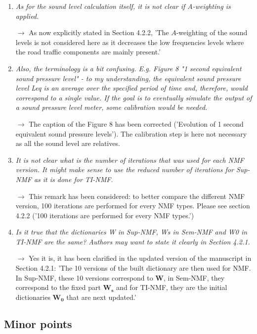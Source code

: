\documentclass[10pt]{article}
\begin{document}
\begin{enumerate}
\item \emph{As for the sound level calculation itself, it is not clear if A-weighting is applied.}

$\rightarrow$ As now explicitly stated in Section 4.2.2, 'The $A$-weighting of the sound levels is not considered here as it decreases the low frequencies levels where the road traffic components are mainly present.'

\item \emph{Also, the terminology is a bit confusing. E.g. Figure 8 "1 second equivalent sound pressure level" - to my understanding, the equivalent sound pressure level Leq is an average over the specified period of time and, therefore, would correspond to a single value. If the goal is to eventually simulate the output of a sound pressure level meter, some calibration would be needed.}

$\rightarrow$ The caption of the Figure 8 has been corrected ('Evolution of 1 second equivalent sound pressure levels'). The calibration step is here not necessary as all the sound level are relatives.

\item \emph{It is not clear what is the number of iterations that was used for each NMF version. It might make sense to use the reduced number of iterations for Sup-NMF as it is done for TI-NMF.}

$\rightarrow$ This remark has been considered: to better compare the different NMF version, 100 iterations are performed for every NMF types. Please see section 4.2.2 ('100 iterations are performed for every NMF types.')

\item \emph{Is it true that the dictionaries W in Sup-NMF, Ws in Sem-NMF and W0 in TI-NMF are the same? Authors may want to state it clearly in Section 4.2.1.}

$\rightarrow$ Yes it is, it has been clarified in the updated version of the manuscript in Section 4.2.1: 'The 10 versions of the built dictionary are then used for NMF. In Sup-NMF, these 10 versions correspond to $\mathbf{W}$, in Sem-NMF, they correspond to the fixed part $\mathbf{W_s}$ and for TI-NMF, they are the initial dictionaries $\mathbf{W_0}$ that are next updated.'

\end{enumerate}
\subsection{Minor points}
\end{document}
